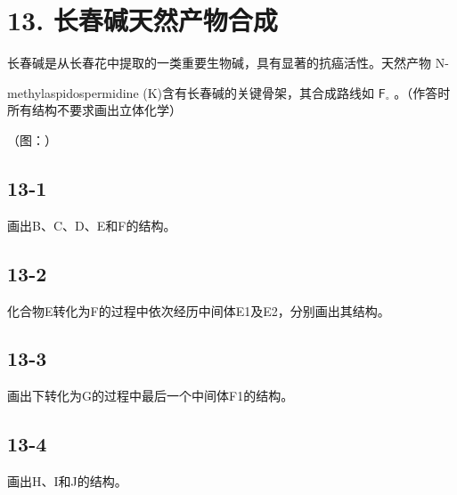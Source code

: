 \section*{13. 长春碱天然产物合成}
⻓春碱是从⻓春花中提取的⼀类重要⽣物碱，具有显著的抗癌活性。天然产物 N-

methylaspidospermidine (K)含有⻓春碱的关键⾻架，其合成路线如 $\mathsf { F } _ { \circ }$ 。（作答时所有结构不要求画出⽴体化学）

（图：）

\subsection*{13-1}
画出B、C、D、E和F的结构。

\subsection*{13-2}
化合物E转化为F的过程中依次经历中间体E1及E2，分别画出其结构。

\subsection*{13-3}
画出下转化为G的过程中最后⼀个中间体F1的结构。

\subsection*{13-4}
画出H、I和J的结构。
